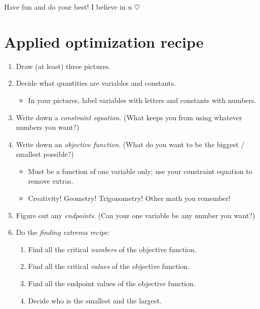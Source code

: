Have fun and do your best! I believe in u $\heartsuit$


\pagebreak

\section{Applied optimization recipe}

\begin{enumerate}[leftmargin=15pt]
    \item Draw (at least) three pictures.
    \item Decide what quantities are variables and constants. 
    \begin{itemize}
        \item In your pictures, label variables with letters and constants with numbers.
    \end{itemize}
    \item Write down a \textit{constraint equation}. (What keeps you from using whatever numbers you want?)
    \item Write down an \textit{objective function}. (What do you want to be the biggest / smallest possible?)
    \begin{itemize}
        \item Must be a function of one variable only; use your constraint equation to remove extras.
        \item Creativity! Geometry! Trigonometry! Other math you remember!
    \end{itemize}
    \item Figure out any \textit{endpoints}. (Can your one variable be any number you want?)
    \item Do the \textit{finding extrema recipe}:
    \begin{enumerate}
        \item Find all the critical \textit{numbers} of the objective function.
        \item Find all the critical \textit{values} of the objective function.
        \item Find all the endpoint values of the objective function.
        \item Decide who is the smallest and the largest.
    \end{enumerate}

\end{enumerate}

